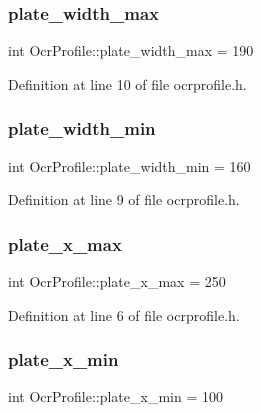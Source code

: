 \subsubsection{\texorpdfstring{plate\+\_\+width\+\_\+max}{plate\_width\_max}}
{\footnotesize\ttfamily int Ocr\+Profile\+::plate\+\_\+width\+\_\+max = 190}



Definition at line 10 of file ocrprofile.\+h.

\mbox{\label{struct_ocr_profile_ace4677abf62d4daede0747c1d45857aa}} 
\subsubsection{\texorpdfstring{plate\+\_\+width\+\_\+min}{plate\_width\_min}}
{\footnotesize\ttfamily int Ocr\+Profile\+::plate\+\_\+width\+\_\+min = 160}



Definition at line 9 of file ocrprofile.\+h.

\mbox{\label{struct_ocr_profile_a9dbeae2c4d98e35544e27fddbee1c87f}} 
\subsubsection{\texorpdfstring{plate\+\_\+x\+\_\+max}{plate\_x\_max}}
{\footnotesize\ttfamily int Ocr\+Profile\+::plate\+\_\+x\+\_\+max = 250}



Definition at line 6 of file ocrprofile.\+h.

\mbox{\label{struct_ocr_profile_ae56e709bcaceff2f934d044d604d88b5}} 
\subsubsection{\texorpdfstring{plate\+\_\+x\+\_\+min}{plate\_x\_min}}
{\footnotesize\ttfamily int Ocr\+Profile\+::plate\+\_\+x\+\_\+min = 100}



